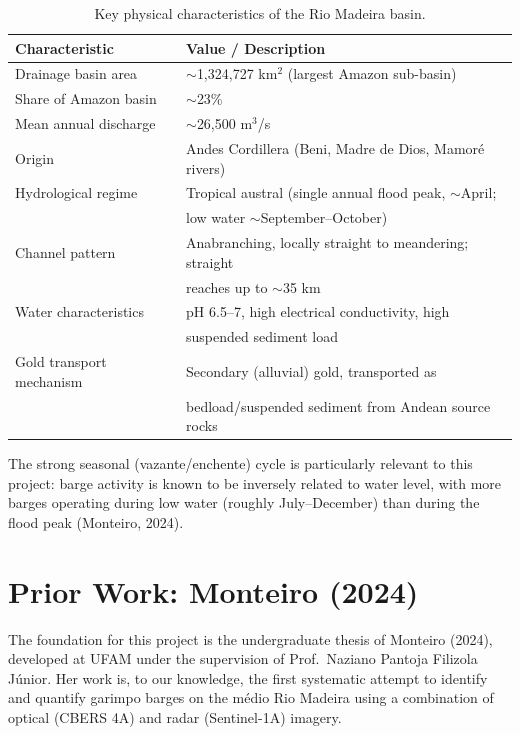 \documentclass[11pt,a4paper]{article}
\begin{document}
\begin{table}[htbp]
\centering
\caption{Key physical characteristics of the Rio Madeira basin.}
\label{tab:river}
\begin{tabular}{ll}
\toprule
\textbf{Characteristic} & \textbf{Value / Description} \\
\midrule
Drainage basin area & $\sim$1,324,727 km$^2$ (largest Amazon sub-basin) \\
Share of Amazon basin & $\sim$23\% \\
Mean annual discharge & $\sim$26,500 m$^3$/s \\
Origin & Andes Cordillera (Beni, Madre de Dios, Mamor\'e rivers) \\
Hydrological regime & Tropical austral (single annual flood peak, $\sim$April; \\
                     & low water $\sim$September--October) \\
Channel pattern & Anabranching, locally straight to meandering; straight \\
                & reaches up to $\sim$35 km \\
Water characteristics & pH 6.5--7, high electrical conductivity, high \\
                       & suspended sediment load \\
Gold transport mechanism & Secondary (alluvial) gold, transported as \\
                          & bedload/suspended sediment from Andean source rocks \\
\bottomrule
\end{tabular}
\end{table}

The strong seasonal (vazante/enchente) cycle is particularly relevant to this
project: barge activity is known to be inversely related to water level, with
more barges operating during low water (roughly July--December) than during
the flood peak (Monteiro, 2024).

\section{Prior Work: Monteiro (2024)}

The foundation for this project is the undergraduate thesis of Monteiro
(2024), developed at UFAM under the supervision of Prof.\ Naziano Pantoja
Filizola J\'unior. Her work is, to our knowledge, the first systematic
attempt to identify and quantify garimpo barges on the m\'edio Rio Madeira
using a combination of optical (CBERS 4A) and radar (Sentinel-1A) imagery.
\end{document}
